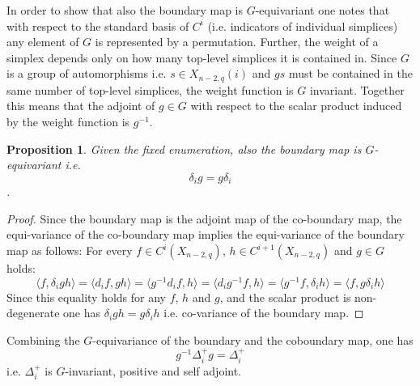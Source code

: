 \documentclass[11pt]{amsart}
\newtheorem{proposition}[theorem]{Proposition}
\newcommand{\iprod}[1]{\langle#1\rangle}
\begin{document}
    In order to show that also the boundary map is $G$-equivariant one notes that with respect to the standard basis of $C^i$ (i.e. indicators of individual simplices) any element of $G$ is represented by a permutation. Further, the weight of a simplex depends only on how many top-level simplices it is contained in. Since $G$ is a group of automorphisms i.e. $s\in X_{n-2,q}(i)$ and $gs$ must be contained in the same number of top-level simplices, the weight function is $G$ invariant. Together this means that the adjoint of $g\in G$ with respect to the scalar product induced by the weight function is $g^{-1}$.
    \begin{proposition}
        Given the fixed enumeration, also the boundary map is $G$-equivariant i.e.
        \begin{equation}
            \delta_ig=g\delta_i
        \end{equation}.
    \end{proposition}
    \begin{proof}
        Since the boundary map is the adjoint map of the co-boundary map, the equi-variance of the co-boundary map implies the equi-variance of the boundary map as follows: For every $f\in C^i(X_{n-2,q})$, $h\in C^{i+1}(X_{n-2,q})$ and $g\in G$ holds:
        \begin{equation}
            \iprod{f,\delta_i gh}=\iprod{d_if,gh}=\iprod{g^{-1}d_if,h}=\iprod{d_ig^{-1}f,h}=\iprod{g^{-1}f,\delta_ih}=\iprod{f,g\delta_ih}
        \end{equation}
        Since this equality holds for any $f$, $h$ and $g$, and the scalar product is non-degenerate one has $\delta_igh=g\delta_ih$ i.e. co-variance of the boundary map.
    \end{proof}
    Combining the $G$-equivariance of the boundary and the coboundary map, one has
    \begin{equation}
        g^{-1}\Delta_i^+g=\Delta_i^+    
    \end{equation}
    i.e. $\Delta_i^+$ is $G$-invariant, positive and self adjoint.
\end{document}
